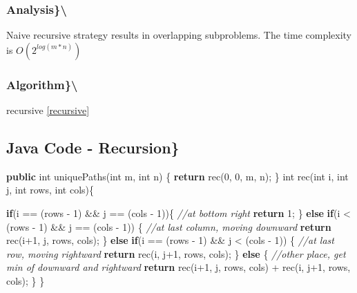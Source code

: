 \documentclass[]{book}
\newenvironment{Shaded}{\begin{snugshade}}{\end{snugshade}}
\newcommand{\CommentTok}[1]{\textcolor[rgb]{0.56,0.35,0.01}{\textit{#1}}}
\newcommand{\DataTypeTok}[1]{\textcolor[rgb]{0.13,0.29,0.53}{#1}}
\newcommand{\DecValTok}[1]{\textcolor[rgb]{0.00,0.00,0.81}{#1}}
\newcommand{\FunctionTok}[1]{\textcolor[rgb]{0.00,0.00,0.00}{#1}}
\newcommand{\KeywordTok}[1]{\textcolor[rgb]{0.13,0.29,0.53}{\textbf{#1}}}
\newcommand{\NormalTok}[1]{#1}
\begin{document}
\hypertarget{analysis-51}{%
\subsubsection{Analysis\}\textbackslash{}}\label{analysis-51}}

Naive recursive strategy results in overlapping subproblems. The time complexity is \(O(2^{log (m * n)})\)

\hypertarget{algorithm-51}{%
\subsubsection{Algorithm\}\textbackslash{}}\label{algorithm-51}}

recursive \ref{recursive}

\hypertarget{java-code---recursion-1}{%
\subsection{Java Code - Recursion\}}\label{java-code---recursion-1}}

\begin{Shaded}
\begin{Highlighting}[]
\KeywordTok{public} \DataTypeTok{int} \FunctionTok{uniquePaths}\NormalTok{(}\DataTypeTok{int}\NormalTok{ m, }\DataTypeTok{int}\NormalTok{ n) \{}
    \KeywordTok{return} \FunctionTok{rec}\NormalTok{(}\DecValTok{0}\NormalTok{, }\DecValTok{0}\NormalTok{, m, n);}
\NormalTok{\}}
\DataTypeTok{int} \FunctionTok{rec}\NormalTok{(}\DataTypeTok{int}\NormalTok{ i, }\DataTypeTok{int}\NormalTok{ j, }\DataTypeTok{int}\NormalTok{ rows, }\DataTypeTok{int}\NormalTok{ cols)\{}

    \KeywordTok{if}\NormalTok{(i == (rows - }\DecValTok{1}\NormalTok{) && j == (cols - }\DecValTok{1}\NormalTok{))\{}
        \CommentTok{//at bottom right}
        \KeywordTok{return} \DecValTok{1}\NormalTok{;}
\NormalTok{    \} }\KeywordTok{else} \KeywordTok{if}\NormalTok{(i < (rows - }\DecValTok{1}\NormalTok{) && j == (cols - }\DecValTok{1}\NormalTok{)) \{}
        \CommentTok{//at last column, moving downward}
        \KeywordTok{return} \FunctionTok{rec}\NormalTok{(i+}\DecValTok{1}\NormalTok{, j, rows, cols);}
\NormalTok{    \} }\KeywordTok{else} \KeywordTok{if}\NormalTok{(i == (rows - }\DecValTok{1}\NormalTok{) && j < (cols - }\DecValTok{1}\NormalTok{)) \{}
        \CommentTok{//at last row, moving rightward}
        \KeywordTok{return} \FunctionTok{rec}\NormalTok{(i, j+}\DecValTok{1}\NormalTok{, rows, cols);}
\NormalTok{    \} }\KeywordTok{else}\NormalTok{ \{}
        \CommentTok{//other place, get min of downward and rightward}
        \KeywordTok{return} \FunctionTok{rec}\NormalTok{(i+}\DecValTok{1}\NormalTok{, j, rows, cols) + }\FunctionTok{rec}\NormalTok{(i, j+}\DecValTok{1}\NormalTok{, rows, cols);}
\NormalTok{    \}}
\NormalTok{\}}
\end{Highlighting}
\end{Shaded}
\end{document}
